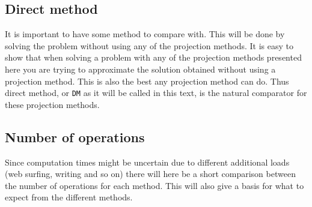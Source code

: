 
\subsection{Direct method}
It is important to have some method to compare with. This will be done by solving the problem without using any of the projection methods. It is easy to show that when solving a problem with any of the projection methods presented here you are trying to approximate the solution obtained without using a projection method. This is also the best any projection method can do. Thus direct method, or \texttt{DM} as it will be called in this text, is the natural comparator for these projection methods.


\subsection{Number of operations}
Since computation times might be uncertain due to different additional loads (web surfing, writing and so on) there will here be a short comparison between the number of operations for each method. This will also give a basis for what to expect from the different methods.\\

